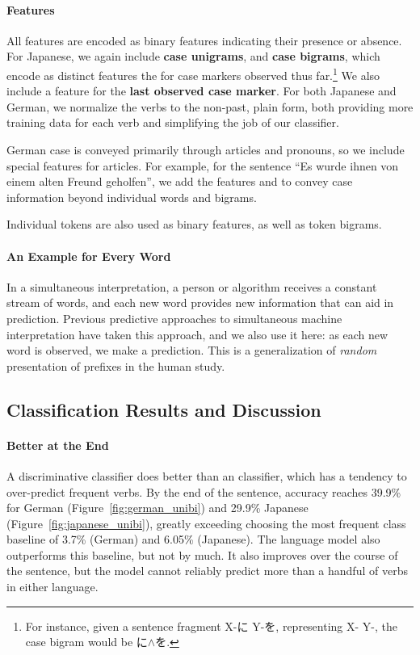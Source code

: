 \paragraph{Features}

All features are encoded as binary features indicating their presence
or absence.  For Japanese, we again include \textbf{case unigrams},
and \textbf{case bigrams}, which encode as distinct features the for
case markers observed thus far.\footnote{For instance, given a
  sentence fragment X-に Y-を, representing X- Y-,
  the case bigram would be に$\wedge$を.}  We also include a feature
for the \textbf{last observed case marker}.  For both Japanese and
German, we normalize the verbs to the non-past, plain form, both
providing more training data for each verb and simplifying the job of
our classifier.

German case is conveyed primarily through articles and pronouns, so we
include special features for articles.  For example, for the sentence
``Es wurde ihnen von einem alten Freund geholfen'', we add the
features  and 
to convey case information beyond individual words and bigrams.

Individual tokens are also used as binary features, as well as token
bigrams.

\paragraph{An Example for Every Word}

In a simultaneous interpretation, a person or algorithm receives a
constant stream of words, and each new word provides new information
that can aid in prediction.  Previous predictive approaches to
simultaneous machine interpretation have taken this approach, and we
also use it here: as each new word is observed, we make a prediction.
This is a generalization of \emph{random} presentation of prefixes in
the human study.

\subsection{Classification Results and Discussion}

\paragraph{Better at the End}

A discriminative classifier does better than an \ngram{} classifier,
which has a tendency to over-predict frequent verbs.  By the end of
the sentence, accuracy reaches 39.9\% for German
(Figure~\ref{fig:german_unibi}) and 29.9\% Japanese
(Figure~\ref{fig:japanese_unibi}), greatly exceeding choosing the most
frequent class baseline of 3.7\% (German) and 6.05\% (Japanese).  The
\ngram{} language model also outperforms this baseline, but not by
much.  It also improves over the course of the sentence, but the model
cannot reliably predict more than a handful of verbs in either
language.


